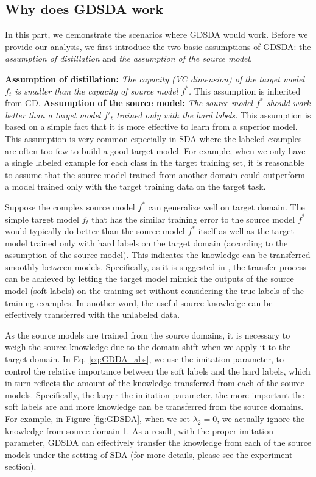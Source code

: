 \subsection{Why does GDSDA work}
In this part, we demonstrate the scenarios where GDSDA would work. Before we provide our analysis, we first introduce the two basic assumptions of GDSDA: the \textit{assumption of distillation} and \textit{the assumption of the source model}.

\textbf{Assumption of distillation:} \textit{The capacity (VC dimension) of the target model $f_t$ is smaller than the capacity of source model $f^*$.} This assumption is inherited from GD.
\textbf{Assumption of the source model:} \textit{The source model $f^*$ should work better than a target model $f'_t$ trained only with the hard labels.} 
This assumption is based on a simple fact that it is more effective to learn from a superior model. This assumption is very common especially in SDA where the labeled examples are often too few to build a good target model.
For example, when we only have a single labeled example for each class in the target training set, it is reasonable to assume that the source model trained from another domain could outperform a model trained only with the target training data on the target task. %

Suppose the complex source model $f^*$ can generalize well on target domain. The simple target model $f_t$ that has the similar training error to the source model $f^*$ would typically do better than the source model $f^*$ itself as well as the target model trained only with hard labels on the target domain (according to the assumption of the source model). This indicates the knowledge can be transferred smoothly between models. Specifically, as it is suggested in \cite{hinton2015distilling}, the transfer process can be achieved by letting the target model mimick the outputs of the source model (soft labels) on the training set without considering the true labels of the training examples. In another word, the useful source knowledge can be effectively transferred with the unlabeled data.

As the source models are trained from the source domains, it is necessary to weigh the source knowledge due to the domain shift\cite{karl2001long} when we apply it to the target domain. In Eq. \eqref{eq:GDDA_abs}, we use the imitation parameter, to control the relative importance between the soft labels and the hard labels, which in turn reflects the amount of the knowledge transferred from each of the source models. Specifically, the larger the imitation parameter, the more important the soft labels are and more knowledge can be transferred from the source domains. 
For example, in Figure \ref{fig:GDSDA}, when we set $\lambda_2=0$, we actually ignore the knowledge from source domain 1.
As a result, with the proper imitation parameter, GDSDA can effectively transfer the knowledge from each of the source models under the setting of SDA (for more details, please see the experiment section).

